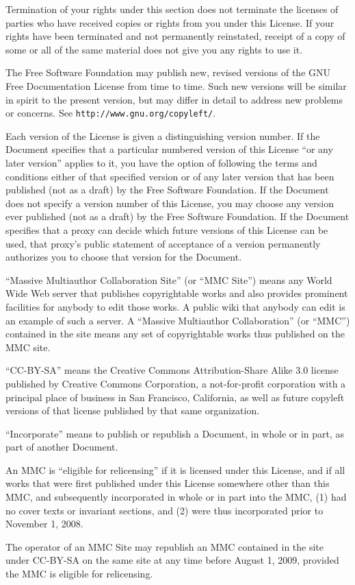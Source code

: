 \documentclass{article}
\begin{document}
Termination of your rights under this section does not terminate the
licenses of parties who have received copies or rights from you under
this License.  If your rights have been terminated and not permanently
reinstated, receipt of a copy of some or all of the same material does
not give you any rights to use it.



The Free Software Foundation may publish new, revised versions
of the GNU Free Documentation License from time to time.  Such new
versions will be similar in spirit to the present version, but may
differ in detail to address new problems or concerns.  See
\texttt{http://www.gnu.org/copyleft/}.

Each version of the License is given a distinguishing version number.
If the Document specifies that a particular numbered version of this
License ``or any later version'' applies to it, you have the option of
following the terms and conditions either of that specified version or
of any later version that has been published (not as a draft) by the
Free Software Foundation.  If the Document does not specify a version
number of this License, you may choose any version ever published (not
as a draft) by the Free Software Foundation.  If the Document
specifies that a proxy can decide which future versions of this
License can be used, that proxy's public statement of acceptance of a
version permanently authorizes you to choose that version for the
Document.



``Massive Multiauthor Collaboration Site'' (or ``MMC Site'') means any
World Wide Web server that publishes copyrightable works and also
provides prominent facilities for anybody to edit those works.  A
public wiki that anybody can edit is an example of such a server.  A
``Massive Multiauthor Collaboration'' (or ``MMC'') contained in the
site means any set of copyrightable works thus published on the MMC
site.

``CC-BY-SA'' means the Creative Commons Attribution-Share Alike 3.0
license published by Creative Commons Corporation, a not-for-profit
corporation with a principal place of business in San Francisco,
California, as well as future copyleft versions of that license
published by that same organization.

``Incorporate'' means to publish or republish a Document, in whole or
in part, as part of another Document.

An MMC is ``eligible for relicensing'' if it is licensed under this
License, and if all works that were first published under this License
somewhere other than this MMC, and subsequently incorporated in whole
or in part into the MMC, (1) had no cover texts or invariant sections,
and (2) were thus incorporated prior to November 1, 2008.

The operator of an MMC Site may republish an MMC contained in the site
under CC-BY-SA on the same site at any time before August 1, 2009,
provided the MMC is eligible for relicensing.
\end{document}
